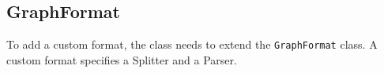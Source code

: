 \subsection{GraphFormat}
To add a custom format, the class needs to extend the \texttt{GraphFormat} class. A custom format specifies a Splitter and a Parser.

